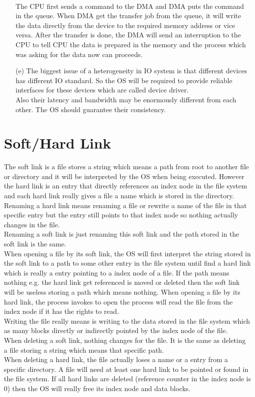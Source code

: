 \documentclass[10pt,twoside,a4paper]{article}
\begin{document}
\begin{itemize}
\\The CPU first sends a command to the DMA and DMA puts the command in the queue. When DMA get the transfer job from the queue, it will write the data directly from the device to the required memory address or vice versa. After the transfer is done, the DMA will send an interruption to the CPU to tell CPU the data is prepared in the memory and the process which was asking for the data now can proceeds.
\item[(e)]
The biggest issue of a heterogeneity in IO system is that different devices has different IO standard. So the OS will be required to provide reliable interfaces for these devices which are called device driver.
\\Also their latency and bandwidth may be enormously different from each other. The OS should guarantee their consistency.

\end{itemize}

\section{Soft/Hard Link}
The soft link is a file stores a string which means a path from root to another file or directory and it will be interpreted by the OS when being executed. However the hard link is an entry that directly references an index node in the file system and each hard link really gives a file a name which is stored in the directory.
\\Renaming a hard link means renaming a file or rewrite a name of the file in that specific entry but the entry still points to that index node so nothing actually changes in the file.
\\Renaming a soft link is just renaming this soft link and the path stored in the soft link is the same.
\\When opening a file by its soft link, the OS will first interpret the string stored in the soft link to a path to some other entry in the file system until find a hard link which is really a entry pointing to a index node of a file. If the path means nothing e.g. the hard link get referenced is moved or deleted then the soft link will be useless storing a path which means nothing. When opening a file by its hard link, the process invokes to open the process will read the file from the index node if it has the rights to read.
\\Writing the file really means is writing to the data stored in the file system which as many blocks directly or indirectly pointed by the index node of the file.
\\When deleting a soft link, nothing changes for the file. It is the same as deleting a file storing a string which means that specific path.
\\When deleting a hard link, the file actually loses a name or a entry from a specific directory. A file will need at least one hard link to be pointed or found in the file system. If all hard links are deleted (reference counter in the index node is 0) then the OS will really free its index node and data blocks.
\end{document}
